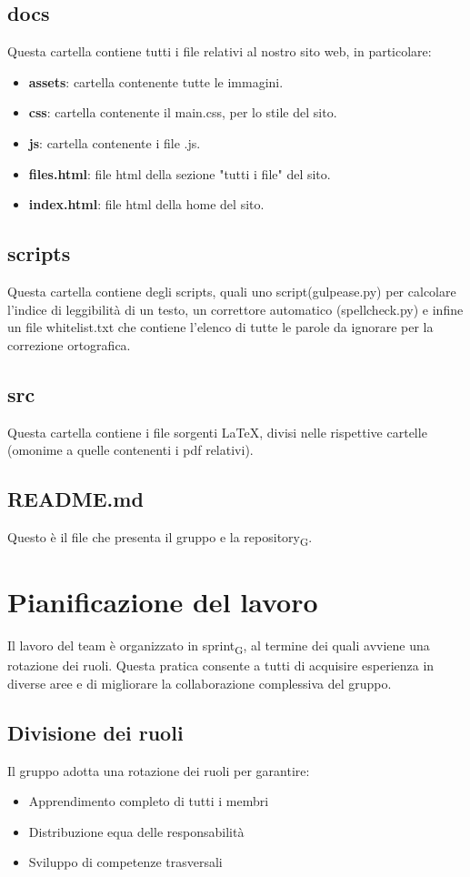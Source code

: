 \documentclass[11pt,a4paper]{article}
\newcommand{\gls}[1]{#1\textsubscript{G}}
\begin{document}
\subsection{docs}
Questa cartella contiene tutti i file relativi al nostro sito web, in particolare:
\begin{itemize}
\item \textbf{assets}: cartella contenente tutte le immagini.
\item \textbf{css}: cartella contenente il main.css, per lo stile del sito.
\item \textbf{js}: cartella contenente i file .js.
\item \textbf{files.html}: file html della sezione "tutti i file" del sito.
\item \textbf{index.html}: file html della home del sito.
\end{itemize}

\subsection{scripts}
Questa cartella contiene degli scripts, quali uno script(gulpease.py) per calcolare l'indice di leggibilità di un testo, un correttore automatico (spellcheck.py) e infine un file whitelist.txt che contiene l'elenco di tutte le parole da ignorare per la correzione ortografica.
\subsection{src}
Questa cartella contiene i file sorgenti LaTeX, divisi nelle rispettive cartelle (omonime a quelle contenenti i pdf relativi).

\subsection{README.md}
Questo è il file che presenta il gruppo e la \gls{repository}.

\newpage

\section{Pianificazione del lavoro}
Il lavoro del team è organizzato in \gls{sprint}, al termine dei quali avviene una rotazione dei ruoli. Questa pratica consente a tutti di acquisire esperienza in diverse aree e di migliorare la collaborazione complessiva del gruppo.

\subsection{Divisione dei ruoli}
Il gruppo adotta una rotazione dei ruoli per garantire:
\begin{itemize}
    \item Apprendimento completo di tutti i membri
    \item Distribuzione equa delle responsabilità
    \item Sviluppo di competenze trasversali
\end{itemize}
\end{document}
